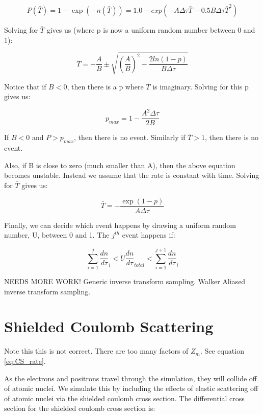 \documentclass[]{article}
\begin{document}
\begin{equation}
P(\bar{T})=1-\exp(-n(\bar{T}))=1.0-exp(-A\Delta \tau \bar{T} - 0.5B\Delta \tau\bar{T}^2)
\end{equation}

Solving for $\bar{T}$ gives us (where p is now a uniform random number between 0 and 1):

\begin{equation}
\bar{T}=-\frac{A}{B} \pm \sqrt{\left( \frac{A}{B} \right)^2 -\frac{2ln(1-p)}{B\Delta \tau} }
\end{equation}

Notice that if $B<0$, then there is a p where $\bar{T}$ is imaginary. Solving for this p gives us:

\begin{equation}
p_{max}=1-\frac{A^2\Delta \tau}{2B}
\end{equation}

If $B<0$ and $P>p_{max}$, then there is no event. Similarly if $\bar{T}>1$, then there is no event.

Also, if B is close to zero (much smaller than A), then the above equation becomes unstable. Instead we assume that the rate is constant with time. Solving for $\bar{T}$ gives us:

\begin{equation}
\bar{T}=-\frac{\exp(1-p)}{A\Delta \tau}
\end{equation}

Finally, we can decide which event happens by drawing a uniform random number, U, between 0 and 1. The $j^{th}$ event happens if:

\begin{equation}
\sum_{i=1}^{j}\frac{dn}{d\tau}_{i} < U\frac{dn}{d\tau}_{total} < \sum_{i=1}^{j+1}\frac{dn}{d\tau}_{i}
\end{equation}

NEEDS MORE WORK! Generic inverse transform sampling. Walker Aliased inverse transform sampling.

\section{Shielded Coulomb Scattering}

Note this this is not correct. There are too many factors of $Z_m$. See equation \ref{eq:CS_rate}.

As the electrons and positrons travel through the simulation, they will collide off of atomic nuclei. We simulate this by including the effects of elastic scattering off of atomic nuclei via the shielded coulomb cross section. The differential cross section for the shielded coulomb cross section is:
\end{document}
